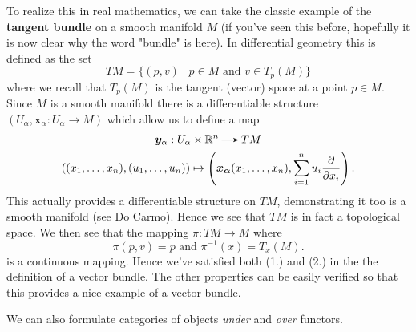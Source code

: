 \begin{example}
            To realize this in real mathematics, we can take the classic example of the 
            \textbf{tangent bundle} on a 
            smooth manifold $M$ (if you've seen this before, hopefully it is now clear why the word "bundle" 
            is here). In differential geometry this is defined as the set 
            \[
                TM = \{(p, v) \mid p \in M \text{ and } v \in T_p(M)\}
            \]
            where we recall that $T_p(M)$ is the tangent (vector) space at 
            a point $p \in M$. 
            Since $M$ is a smooth manifold there is a differentiable 
            structure $(U_\alpha, \bm{x}_\alpha: U_\alpha \to M)$
            which allow us to define a map 
            \begin{gather*}
                \bm{y}_\alpha: U_\alpha \times \rr^n \to TM \\
                ((x_1, \dots, x_n), (u_1, \dots, u_n)) \mapsto 
                \left(\bm{x_{\alpha}}(x_1, \dots, x_n), \sum_{i=1}^{n}u_i\frac{\partial}{\partial x_i} \right).
            \end{gather*}
            This actually provides a differentiable structure on $TM$, demonstrating it 
            too is a smooth manifold (see Do Carmo). Hence we see that $TM$ is in fact a topological space. 
            We then see that the mapping
            $\pi: TM \to M$ where 
            \[
                \pi(p, v) = p \text{ and } \pi^{-1}(x) = T_x(M).
            \]
            is a continuous mapping.
            Hence we've satisfied both (1.) and (2.) in the the definition of a vector bundle. 
            The other properties can be easily verified so that this provides a nice example of a 
            vector bundle.
        \end{example}

        We can also formulate categories of objects \textit{under} and
        \textit{over} functors. 

